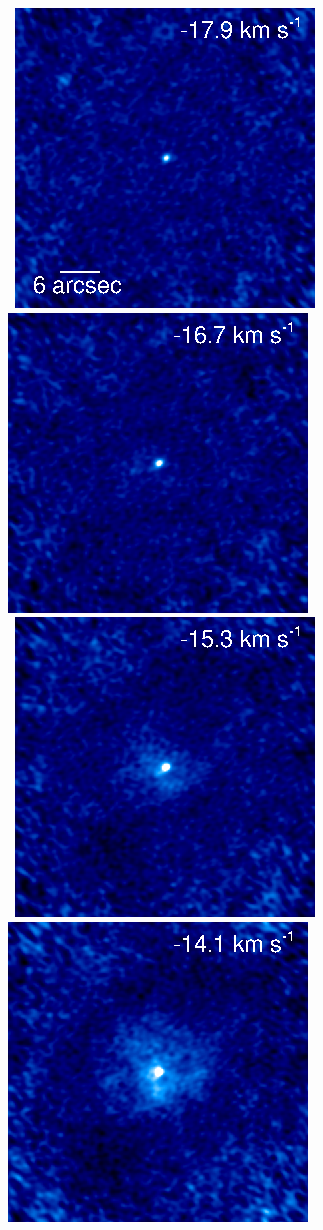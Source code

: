 \documentclass[iop]{emulateapj}
\begin{document}
\begin{figure}[hbt!]
\mbox{
          \includegraphics[]{chan41new.ps}
          \includegraphics[]{chan40.ps}
          }
\\
\mbox{
          \includegraphics[]{chan39.ps}
          \includegraphics[]{chan38.ps}
}
\end{figure}
\end{document}
